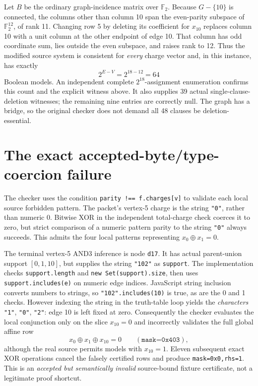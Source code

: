 \documentclass[11pt]{article}
\begin{document}
Let $B$ be the ordinary graph-incidence matrix over $\mathbb F_2$.
Because $G-\{10\}$ is connected, the columns other than column 10
span the even-parity subspace of $\mathbb F_2^{12}$, of rank 11.
Changing row 5 by deleting its coefficient for $x_{10}$ replaces column
10 with a unit column at the other endpoint of edge 10. That column has
odd coordinate sum, lies outside the even subspace, and raises rank to
12. Thus the modified source system is consistent for \emph{every}
charge vector and, in this instance, has exactly
\[
 2^{E-V}=2^{18-12}=64
\]
Boolean models. An independent complete $2^{18}$-assignment enumeration
confirms this count and the explicit witness above. It also supplies
39 actual single-clause-deletion witnesses; the remaining nine entries
are correctly null. The graph has a bridge, so the original checker
does not demand all 48 clauses be deletion-essential.

\section*{The exact accepted-byte/type-coercion failure}
The checker uses the condition
\texttt{parity !== f.charges[v]} to validate each local source
forbidden pattern. The packet's vertex-5 charge is the string
\texttt{"0"}, rather than numeric 0. Bitwise XOR in the independent
total-charge check coerces it to zero, but strict comparison of a
numeric pattern parity to the string \texttt{"0"} always succeeds.
This admits the four local patterns representing $x_0\oplus x_1=0$.

The terminal vertex-5 AND3 inference is node \texttt{d17}. It has
actual parent-union support $[0,1,10]$, but supplies the string
\texttt{"102"} as \texttt{support}. The implementation checks
\texttt{support.length} and \texttt{new Set(support).size},
then uses \texttt{support.includes(e)} on numeric edge indices.
JavaScript string inclusion converts numbers to strings, so
\texttt{"102".includes(10)} is true, as are the 0 and 1 checks.
However indexing the string in the truth-table loop yields the
\emph{characters} \texttt{"1"}, \texttt{"0"}, \texttt{"2"}:
edge 10 is left fixed at zero. Consequently the checker evaluates
the local conjunction only on the slice $x_{10}=0$ and incorrectly
validates the full global affine row
\[
 x_0\oplus x_1\oplus x_{10}=0
 \qquad (\texttt{mask=0x403}),
\]
although the real source permits models with $x_{10}=1$.
Eleven subsequent exact XOR operations cancel the falsely certified
rows and produce \texttt{mask=0x0,rhs=1}.
This is an \emph{accepted but semantically invalid} source-bound
fixture certificate, not a legitimate proof shortcut.
\end{document}
